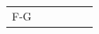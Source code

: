 {\begin{tabular}[t]{|l|l|l|l|l|l|}
     \tabularnewline\cline{1-1}\cline{2-2}\cline{3-3}\cline{4-4}\cline{5-5}\cline{6-6}
        F-G &
         &
         &
         &
         &
     \tabularnewline\cline{1-1}\cline{2-2}\cline{3-3}\cline{4-4}\cline{5-5}\cline{6-6}
    \end{tabular}} %
        \addtolength{\mytableboxheight}{\mytableboxdepth}
